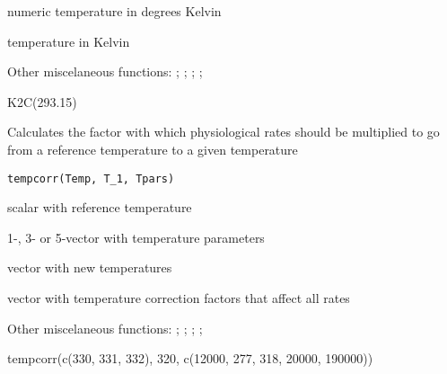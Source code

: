 \documentclass[a4paper]{book}
\begin{document}
%
\begin{Arguments}
\begin{ldescription}
\item[\code{K}] numeric temperature in degrees Kelvin
\end{ldescription}
\end{Arguments}
%
\begin{Value}
temperature in Kelvin
\end{Value}
%
\begin{SeeAlso}\relax
Other miscelaneous functions: ;
; ;
; 
\end{SeeAlso}
%
\begin{Examples}
\begin{ExampleCode}
K2C(293.15)
\end{ExampleCode}
\end{Examples}
%
\begin{Description}\relax
Calculates the factor with which physiological rates should be multiplied to go from a reference temperature to a given temperature
\end{Description}
%
\begin{Usage}
\begin{verbatim}
tempcorr(Temp, T_1, Tpars)
\end{verbatim}
\end{Usage}
%
\begin{Arguments}
\begin{ldescription}
\item[\code{T\_1}] scalar with reference temperature

\item[\code{Tpars}] 1-, 3- or 5-vector with temperature parameters

\item[\code{T}] vector with new temperatures
\end{ldescription}
\end{Arguments}
%
\begin{Value}
vector with temperature correction factors that affect all rates
\end{Value}
%
\begin{SeeAlso}\relax
Other miscelaneous functions: ;
; ;
; 
\end{SeeAlso}
%
\begin{Examples}
\begin{ExampleCode}
tempcorr(c(330, 331, 332), 320, c(12000, 277, 318, 20000, 190000))
\end{ExampleCode}
\end{Examples}
\printindex{}
\end{document}
